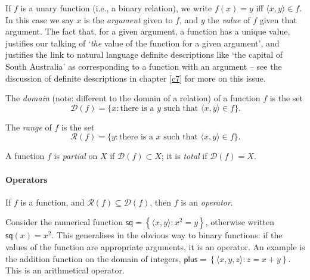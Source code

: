 If $f$ is a unary function (i.e., a binary relation), we write $f(x) = y$ iff $\langle x,y\rangle \in f$. In this case we say $x$ is the \emph{argument} given to $f$, and $y$ the \emph{value} of $f$ given that argument. The fact that, for a given argument, a function has a unique value, justifies our talking of `\emph{the} value of the function for a given argument', and justifies the link to natural language definite descriptions like `the capital of South Australia' as corresponding to a function with an argument – see the discussion of definite descriptions in chapter \ref{c7} for more on this issue.
\begin{definition}[Domain]
The \emph{domain} (note: different to the domain of a relation) of a function  $f$ is the set $$\mathcal{D}(f)=\{x: \text{there is a $y$ such that } \langle x,y \rangle \in f\}.$$
\end{definition}
\begin{definition}[Range]
	The \emph{range} of $f$ is the set $$\mathcal{R}(f)=\{y: \text{there is a $x$ such that } \langle x,y \rangle \in f\}.$$
\end{definition}
\begin{definition}
	A function
$f$ is \emph{partial}  on $X$ if $\mathcal{D}(f) \subset X$; it is \emph{total} if $\mathcal{D}(f) =X$.
\end{definition}

\paragraph{Operators}
\begin{definition}[Operator]
	If $f$ is a function, and $\mathcal{R}(f) \subseteq \mathcal{D}(f)$, then $f$ is an \emph{operator}.
\end{definition}
Consider the numerical function $\mathsf{sq} = \left\{\langle x,y\rangle: x^{2} = y\right\}$, otherwise written $\mathsf{sq}(x) = x^2$. This generalises in the obvious way to binary functions: if the values of the function are appropriate arguments, it is an operator. An example is the addition function on the domain of integers, $\mathsf{plus} = \left\{\langle x, y, z\rangle : z = x + y\right\}$. This is an arithmetical operator.


